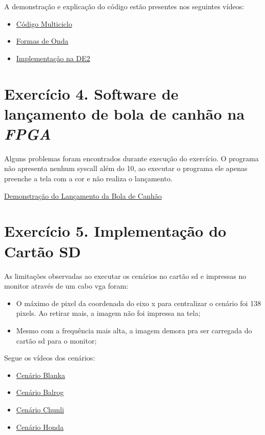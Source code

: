 \documentclass[12pt]{article}
\begin{document}
A demonstração e explicação do código estão presentes nos seguintes vídeos:

\begin{itemize}
\item \href{https://youtu.be/byjAeoPzvlc}{Código Multiciclo}
\item \href{https://youtu.be/1yfLxiZ4ztI}{Formas de Onda}
\item \href{https://youtu.be/0KF8iVj7nfM}{Implementação na DE2} 
\end{itemize}


\section{Exercício 4. Software de lançamento de bola de canhão na \textit{FPGA}}
\label{sec:canhao}

Alguns problemas foram encontrados durante execução do exercício. O programa não apresenta nenhum syscall além do 10, ao executar o programa ele apenas preenche a tela com a cor e não realiza o lançamento.

\href{https://youtu.be/KM9j9fGKz6c}{Demonstração do Lançamento da Bola de Canhão}


\section{Exercício 5. Implementação do Cartão SD}
\label{sec:cartaosd}

As limitações observadas ao executar os cenários no cartão sd e impressas no monitor através de um cabo vga foram:

\begin{itemize}
\item O máximo de pixel da coordenada do eixo x para centralizar o cenário foi 138 pixels. Ao retirar mais, a imagem não foi impressa na tela;
\item Mesmo com a frequência mais alta, a imagem demora pra ser carregada do cartão sd para o monitor;
\end{itemize} 

Segue os vídeos dos cenários:

\begin{itemize}
\item \href{https://youtu.be/a2omO8XZJIs}{Cenário Blanka}
\item \href{https://youtu.be/1NFspVSaYR4}{Cenário Balrog}
\item \href{https://youtu.be/9PXeOKTCW-Y}{Cenário Chunli}
\item \href{}{Cenário Honda}
\end{itemize}
\end{document}
